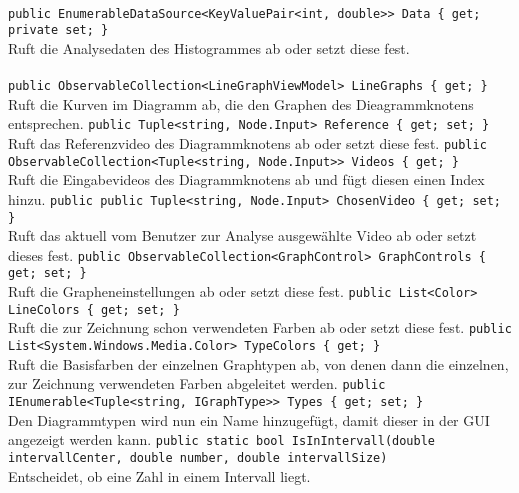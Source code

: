 \paragraph{}
\begin{itemize}
	\add \verb!public EnumerableDataSource<KeyValuePair<int, double>> Data { get; private set; }! \\
	Ruft die Analysedaten des Histogrammes ab oder setzt diese fest.
\end{itemize}

\paragraph{}
\begin{itemize}
	\add \verb!public ObservableCollection<LineGraphViewModel> LineGraphs { get; }! \\
	Ruft die Kurven im Diagramm ab, die den Graphen des Dieagrammknotens entsprechen. 
	\add \verb!public Tuple<string, Node.Input> Reference { get; set; }! \\
	Ruft das Referenzvideo des Diagrammknotens ab oder setzt diese fest.
	\add \verb!public ObservableCollection<Tuple<string, Node.Input>> Videos { get; }! \\
	Ruft die Eingabevideos des Diagrammknotens ab und fügt diesen einen Index hinzu.
	\add \verb!public public Tuple<string, Node.Input> ChosenVideo { get; set; }! \\
	Ruft das aktuell vom Benutzer zur Analyse ausgewählte Video ab oder setzt dieses fest.
	\add \verb!public ObservableCollection<GraphControl> GraphControls { get; set; }! \\
	Ruft die Grapheneinstellungen ab oder setzt diese fest.
	\add \verb!public List<Color> LineColors { get; set; }! \\
	Ruft die zur Zeichnung schon verwendeten Farben ab oder setzt diese fest.
	\add \verb!public List<System.Windows.Media.Color> TypeColors { get; }! \\
	Ruft die Basisfarben der einzelnen Graphtypen ab, von denen dann die einzelnen, zur Zeichnung verwendeten Farben abgeleitet werden.
	\change \verb!public IEnumerable<Tuple<string, IGraphType>> Types { get; set; }! \\
	Den Diagrammtypen wird nun ein Name hinzugefügt, damit dieser in der GUI angezeigt werden kann.
	\add \verb!public static bool IsInIntervall(double intervallCenter, double number, double intervallSize)! \\
	Entscheidet, ob eine Zahl in einem Intervall liegt.

\end{itemize}
